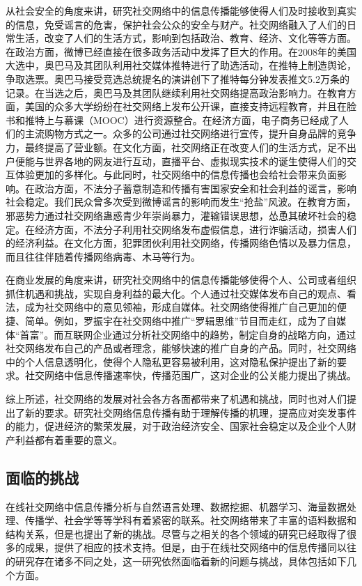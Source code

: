 从社会安全的角度来讲，研究社交网络中的信息传播能够使得人们及时接收到真实的信息，免受谣言的危害，保护社会公众的安全与财产。社交网络融入了人们的日常生活，改变了人们的生活方式，影响到包括政治、教育、经济、文化等等方面。在政治方面，微博已经直接在很多政务活动中发挥了巨大的作用。在2008年的美国大选中，奥巴马及其团队利用社交媒体推特进行了助选活动，在推特上制造舆论，争取选票。奥巴马接受竞选总统提名的演讲创下了推特每分钟发表推文5.2万条的记录。在当选之后，奥巴马及其团队继续利用社交网络提高政治影响力。在教育方面，美国的众多大学纷纷在社交网络上发布公开课，直接支持远程教育，并且在脸书和推特上与慕课（MOOC）进行资源整合。在经济方面，电子商务已经成了人们的主流购物方式之一。众多的公司通过社交网络进行宣传，提升自身品牌的竞争力，最终提高了营业额。在文化方面，社交网络正在改变人们的生活方式，足不出户便能与世界各地的网友进行互动，直播平台、虚拟现实技术的诞生使得人们的交互体验更加的多样化。与此同时，社交网络中的信息传播也会给社会带来负面影响。在政治方面，不法分子蓄意制造和传播有害国家安全和社会利益的谣言，影响社会稳定。我们民众曾多次受到微博谣言的影响而发生“抢盐”风波。在教育方面，邪恶势力通过社交网络蛊惑青少年崇尚暴力，灌输错误思想，怂恿其破坏社会的稳定。在经济方面，不法分子利用社交网络发布虚假信息，进行诈骗活动，损害人们的经济利益。在文化方面，犯罪团伙利用社交网络，传播网络色情以及暴力信息，而且往往伴随着传播网络病毒、木马等行为。

在商业发展的角度来讲，研究社交网络中的信息传播能够使得个人、公司或者组织抓住机遇和挑战，实现自身利益的最大化。个人通过社交媒体发布自己的观点、看法，成为社交网络中的意见领袖，形成自媒体。社交网络使得推广自己更加的便捷、简单。例如，罗振宇在社交网络中推广“罗辑思维”节目而走红，成为了自媒体“首富”。而互联网企业通过分析社交网络中的趋势，制定自身的战略方向，通过社交网络发布自己的产品或者理念，能够快速的推广自身的产品。同时，社交网络中的个人信息透明化，使得个人隐私更容易被利用，这对隐私保护提出了新的要求。社交网络中信息传播速率快，传播范围广，这对企业的公关能力提出了挑战。

综上所述，社交网络的发展对社会各方各面都带来了机遇和挑战，同时也对人们提出了新的要求。研究社交网络信息传播有助于理解传播的机理，提高应对突发事件的能力，促进经济的繁荣发展，对于政治经济安全、国家社会稳定以及企业个人财产利益都有着重要的意义。
\subsection{面临的挑战}
\label{subsec1:challenge}
在线社交网络中信息传播分析与自然语言处理、数据挖掘、机器学习、海量数据处理、传播学、社会学等等学科有着紧密的联系。社交网络带来了丰富的语料数据和结构关系，但是也提出了新的挑战。尽管与之相关的各个领域的研究已经取得了很多的成果，提供了相应的技术支持。但是，由于在线社交网络中的信息传播同以往的研究存在诸多不同之处，这一研究依然面临着新的问题与挑战，具体包括如下几个方面。

